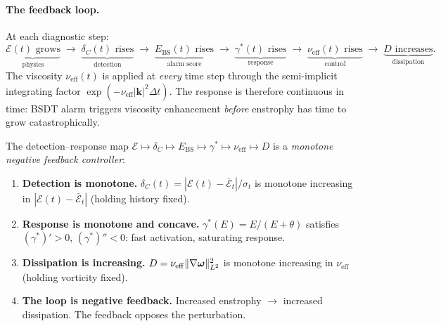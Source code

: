 \paragraph{The feedback loop.}
At each diagnostic step:
\[
  \underbrace{\mathcal{E}(t) \text{ grows}}_{\text{physics}}
  \;\longrightarrow\;
  \underbrace{\delta_C(t) \text{ rises}}_{\text{detection}}
  \;\longrightarrow\;
  \underbrace{E_{\mathrm{BS}}(t) \text{ rises}}_{\text{alarm score}}
  \;\longrightarrow\;
  \underbrace{\gamma^*(t) \text{ rises}}_{\text{response}}
  \;\longrightarrow\;
  \underbrace{\nu_{\mathrm{eff}}(t) \text{ rises}}_{\text{control}}
  \;\longrightarrow\;
  \underbrace{D \text{ increases}}_{\text{dissipation}}.
\]
The viscosity $\nu_{\mathrm{eff}}(t)$ is applied at \emph{every}
time step through the semi-implicit integrating factor
$\exp(-\nu_{\mathrm{eff}} |\bm{k}|^2 \Delta t)$.  The response
is therefore continuous in time: BSDT alarm triggers viscosity
enhancement \emph{before} enstrophy has time to grow
catastrophically.

\begin{proposition}\label{prop:feedback}
The detection--response map
$\mathcal{E} \mapsto \delta_C \mapsto E_{\mathrm{BS}} \mapsto
\gamma^* \mapsto \nu_{\mathrm{eff}} \mapsto D$
is a \emph{monotone negative feedback controller}:
\begin{enumerate}
\item[\textup{(i)}] \textbf{Detection is monotone.}
  $\delta_C(t) = |\mathcal{E}(t) - \bar{\mathcal{E}}_t|/\sigma_t$
  is monotone increasing in $|\mathcal{E}(t) - \bar{\mathcal{E}}_t|$
  (holding history fixed).

\item[\textup{(ii)}] \textbf{Response is monotone and concave.}
  $\gamma^*(E) = E/(E+\theta)$ satisfies $(\gamma^*)' > 0$,
  $(\gamma^*)'' < 0$: fast activation, saturating response.

\item[\textup{(iii)}] \textbf{Dissipation is increasing.}
  $D = \nu_{\mathrm{eff}} \lVert \nabla\bm{\omega} \rVert_{L^2}^2$
  is monotone increasing in $\nu_{\mathrm{eff}}$
  (holding vorticity fixed).

\item[\textup{(iv)}] \textbf{The loop is negative feedback.}
  Increased enstrophy $\to$ increased dissipation.  The feedback
  opposes the perturbation.
\end{enumerate}
\end{proposition}

